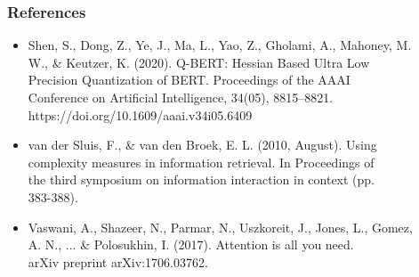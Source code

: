 \documentclass{beamer}
\begin{document}
\begin{frame}
	\frametitle{References}
	\begin{itemize}
		\item Shen, S., Dong, Z., Ye, J., Ma, L., Yao, Z., Gholami, A., Mahoney, M. \\\hspace{1cm}W., \& Keutzer, K.
		(2020). Q-BERT: Hessian Based Ultra Low \\\hspace{1cm}Precision Quantization of BERT.
		Proceedings of the AAAI \\\hspace{1cm}Conference on Artificial Intelligence, 34(05), 8815–8821.
		\\\hspace{1cm}https://doi.org/10.1609/aaai.v34i05.6409
		\item van der Sluis, F., \& van den Broek, E. L. (2010, August). Using \\\hspace{1cm}complexity measures in
		information retrieval. In Proceedings of \\\hspace{1cm}the third symposium on information
		interaction in context (pp. \\\hspace{1cm}383-388).
		\item Vaswani, A., Shazeer, N., Parmar, N., Uszkoreit, J., Jones, L., Gomez, \\\hspace{1cm}A. N., ... \&
		Polosukhin, I. (2017). Attention is all you need. \\\hspace{1cm}arXiv preprint arXiv:1706.03762.
	\end{itemize}
\end{frame}
\end{document}

